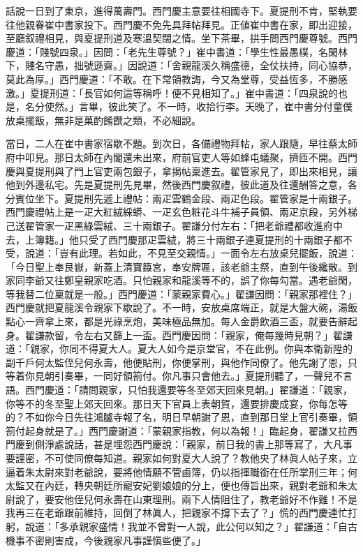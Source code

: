 話說一日到了東京，進得萬壽門。西門慶主意要往相國寺下。夏提刑不肯，堅執要往他親眷崔中書家投下。西門慶不免先具拜帖拜見。正値崔中書在家，即出迎接，至廳叙禮相見，與夏提刑道及寒溫契闊之情。坐下茶畢，拱手問西門慶尊號。西門慶道：「賤號四泉。」因問：「老先生尊號？」崔中書道：「學生性最愚樸，名閑林下，賤名守愚，拙號遜齋。」因說道：「舍親龍溪久稱盛德，全仗扶持，同心協恭，莫此為厚。」西門慶道：「不敢。在下常領教誨，今又為堂尊，受益恆多，不勝感激。」夏提刑道：「長官如何這等稱呼！便不見相知了。」崔中書道：「四泉說的也是，名分使然。」言畢，彼此笑了。不一時，收拾行李。天晚了，崔中書分付童僕放桌擺飯，無非是菓酌餚饌之類，不必細說。

當日，二人在崔中書家宿歇不題。到次日，各備禮物拜帖，家人跟隨，早往蔡太師府中叩見。那日太師在內閣還未出來，府前官吏人等如蜂屯蟻聚，擠匝不開。西門慶與夏提刑與了門上官吏兩包銀子，拿揭帖稟進去。翟管家見了，即出來相見，讓他到外邊私宅。先是夏提刑先見畢，然後西門慶叙禮，彼此道及往還酬答之意，各分賓位坐下。夏提刑先遞上禮帖：兩疋雲鶴金段、兩疋色段。翟管家是十兩銀子。西門慶禮帖上是一疋大紅絨綵蟒、一疋玄色粧花斗牛補子員領、兩疋京段，另外梯己送翟管家一疋黑綠雲絨、三十兩銀子。{}翟謙分付左右：「把老爺禮都收進府中去，上簿籍。」他只受了西門慶那疋雲絨，將三十兩銀子連夏提刑的十兩銀子都不受，說道：「豈有此理。若如此，不見至交親情。」一面令左右放桌兒擺飯，說道：「今日聖上奉艮嶽，新蓋上清寶籙宮，奉安牌匾，該老爺主祭，直到午後纔散。到家同李爺又往鄭皇親家吃酒。只怕親家和龍溪等不的，誤了你每勾當。遇老爺閑，等我替二位稟就是一般。」西門慶道：「蒙親家費心。」翟謙因問：「親家那裡住？」西門慶就把夏龍溪令親家下歇說了。不一時，安放桌席端正，就是大盤大碗，湯飯點心一齊拿上來，都是光祿烹炮，美味極品無加。每人金爵飲酒三盃，就要告辭起身。翟謙款留，令左右又篩上一盃。西門慶因問：「親家，俺每幾時見朝？」翟謙道：「親家，你同不得夏大人。夏大人如今是京堂官，不在此例。你與本衛新陞的副千戶何太監侄兒何永壽，他便貼刑，你便掌刑，與他作同僚了。他先謝了恩，只等着你見朝引奏畢，一同好領箚付。你凡事只會他去。」夏提刑聽了，一聲兒不言語。西門慶道：「請問親家，只怕我還要等冬至郊天回來見朝。」翟謙道：「親家，你等不的冬至聖上郊天回來。那日天下官員上表朝賀，還要排慶成宴，你每怎等的？不如你今日先往鴻臚寺報了名，明日早朝謝了恩，直到那日堂上官引奏畢，領箚付起身就是了。」西門慶謝道：「蒙親家指教，何以為報！」臨起身，翟謙又拉西門慶到側淨處說話，{}甚是埋怨西門慶說：「親家，前日我的書上那等寫了，大凡事要謹密，不可使同僚每知道。親家如何對夏大人說了？{}教他央了林眞人帖子來，立逼着朱太尉來對老爺說，{}要將他情願不管鹵簿，仍以指揮職銜在任所掌刑三年；何太監又在內廷，轉央朝廷所寵安妃劉娘娘的分上，便也傳旨出來，親對老爺和朱太尉說了，要安他侄兒何永壽在山東理刑。兩下人情阻住了，教老爺好不作難！不是我再三在老爺跟前維持，回倒了林眞人，把親家不撐下去了？」慌的西門慶連忙打躬，說道：「多承親家盛情！我並不曾對一人說，此公何以知之？」翟謙道：「自古機事不密則害成，今後親家凡事謹愼些便了。」

